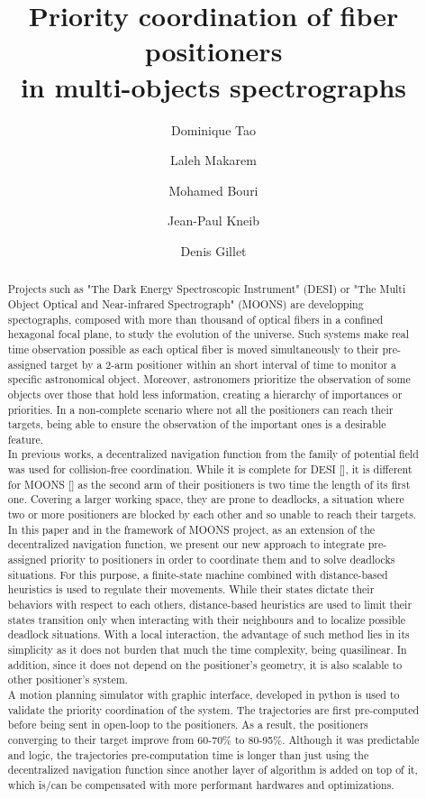 \documentclass[]{spie}  %
\title{Priority coordination of fiber positioners\\
	in multi-objects spectrographs }
\author[a]{Dominique Tao}
\author[b]{Laleh Makarem}
\author[c]{Mohamed Bouri}
\author[d]{Jean-Paul Kneib}
\author[e]{Denis Gillet}
\affil[a,b,e]{REACT, Ecole Polytechnique Federale de Lausanne (EPFL), Switzerland}
\affil[c]{LSRO, Ecole Polytechnique Federale de Lausanne (EPFL), Switzerland}
\affil[d]{LASTRO, Ecole Polytechnique Federale de Lausanne (EPFL), Switzerland}
\begin{document}
 
	\maketitle
	
	\begin{abstract}
		Projects such as "The Dark Energy Spectroscopic Instrument" (DESI) or  "The Multi Object Optical and Near-infrared Spectrograph" (MOONS) are developping spectographs, composed with more than thousand of optical fibers in a confined hexagonal focal plane, to study the evolution of the universe. Such systems make real time observation possible as each optical fiber is moved simultaneously to their pre-assigned target by a 2-arm positioner within an short interval of time to monitor a specific astronomical object. Moreover, astronomers prioritize the observation of some objects over those that hold less information, creating a hierarchy of importances or priorities. In a non-complete scenario where not all the positioners can reach their targets, being able to ensure the observation of the important ones is a desirable feature. \\
		In previous works, a decentralized navigation function from the family of potential field was used for collision-free coordination. While it is complete for DESI [], it is different for MOONS [] as the second arm of their positioners is two time the length of its first one. Covering a larger working space, they are prone to deadlocks, a situation where two or more positioners are blocked by each other and so unable to reach their targets.\\
		In this paper and in the framework of MOONS project, as an extension of the decentralized navigation function, we present our new approach to integrate pre-assigned priority to positioners in order to coordinate them and to solve deadlocks situations. For this purpose, a finite-state machine combined with distance-based heuristics is used to regulate their movements. While their states dictate their behaviors with respect to each others, distance-based heuristics are used to limit their states transition only when interacting with their neighbours and to localize possible deadlock situations. With a local interaction, the advantage of such method lies in its simplicity as it does not burden that much the time complexity, being quasilinear. In addition, since it does not depend on the positioner's geometry, it is also scalable to other positioner's system. \\
		A motion planning simulator with graphic interface, developed in python is used to validate the priority coordination of the system. The trajectories are first pre-computed before being sent in open-loop to the positioners.
		As a result, the positioners converging to their target improve from 60-70\% to 80-95\%. 
		Although it was predictable and logic, the trajectories pre-computation time is longer than just using the decentralized navigation function since another layer of algorithm is added on top of it, which is/can be compensated with more performant hardwares and optimizations. 
	\end{abstract}
	
\end{document}
